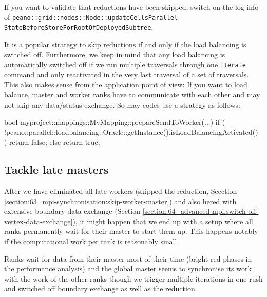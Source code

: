   
\begin{remark}
  If you want to validate that reductions have been skipped, switch on the log
  info of 
  \texttt{peano::grid::nodes::Node::updateCellsParallel}
  \texttt{StateBeforeStoreForRootOfDeployedSubtree}.
\end{remark}

\noindent
It is a popular strategy to skip reductions if and only if the load balancing is
switched off.
Furthermore, we keep in mind that any load balancing is automatically
switched off if we run multiple traversals through one \texttt{iterate} command
and only reactivated in the very last traversal of a set of traversals.
This also makes sense from the application point of view:
If you want to load balance, master and worker ranks have to communicate with
each other and may not skip any data/status exchange.
So may codes use a strategy as follows:

\begin{code}
bool myproject::mappings::MyMapping::prepareSendToWorker(...) {
  if (
    !peano::parallel::loadbalancing::Oracle::getInstance().isLoadBalancingActivated()
  ) {
    return false;
  }
  else return true;
}
\end{code}




\subsection{Tackle late masters}

After we have eliminated all late workers (skipped the reduction, Secction
\ref{section:63_mpi-synchronisation:skip-worker-master}) and also hered with
extensive boundary data exchange (Section
\ref{section:64_advanced-mpi:switch-off-vertex-data-exchange}), it might happen
that we end up with a setup where all ranks permanently wait for their master to
start them up.
This happens notably if the computational work per rank is reasonably small.

\begin{smell}
  Ranks wait for data from their master most of their time (bright red phases
  in the performance analysis) and the global master seems to synchronise its
  work with the work of the other ranks though we trigger multiple iterations in
  one rush and switched off boundary exchange as well as the reduction.
\end{smell}


